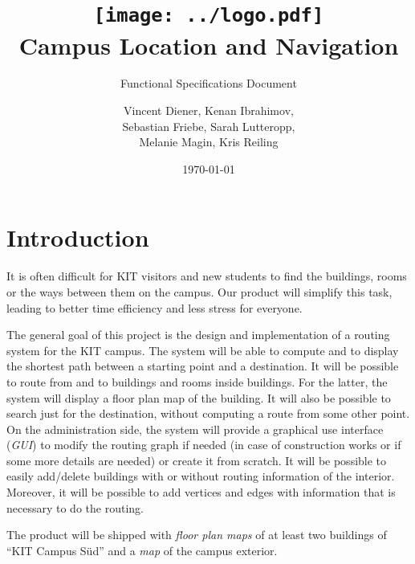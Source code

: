 \documentclass[a4paper, 11pt]{scrartcl}
\author{Vincent Diener, Kenan Ibrahimov,\\ 
        Sebastian Friebe, Sarah Lutteropp,\\ 
        Melanie Magin, Kris Reiling}
\title{%
         \texttt{[image: ../logo.pdf]}\\
         \vspace{5mm}
         Campus Location and Navigation
         \vspace{5mm}}
\subtitle{Functional Specifications Document}
\date{\today}
\begin{document}
\maketitle
\thispagestyle{empty}

\newpage

\tableofcontents

\newpage


\section{Introduction}

It is often difficult for KIT visitors and new students to find the buildings, rooms or the ways between them on the campus. Our product will simplify this task, leading to better time efficiency and less stress for everyone.

The general goal of this project is the design and implementation of a routing system for the KIT campus. The system will be able to compute and to display the shortest path between a starting point and a destination. It will be possible to route from and to buildings and rooms inside buildings. For the latter, the system will display a floor plan map of the building. It will also be possible to search just for the destination, without computing a route from some other point. \\

\noindent On the administration side, the system will provide a graphical use interface (\textit{GUI}) to modify the routing graph if needed (in case of construction works or if some more details are needed) or create it from scratch. It will be possible to easily add/delete buildings with or without routing information of the interior. Moreover, it will be possible to add vertices and edges with information that is necessary to do the routing.

The product will be shipped with \textit{floor plan maps} of at least two buildings of ``KIT Campus Süd'' and a \textit{map} of the campus exterior.


\end{document}
